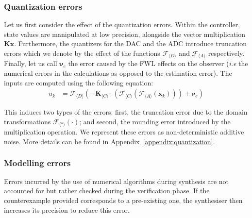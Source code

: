 \documentclass[sigconf]{llncs}
\newcommand{\mat}[1]{\boldsymbol{#1}}
\renewcommand{\vec}[1]{\boldsymbol{#1}}
\begin{document}



\subsubsection{Quantization errors} \label{sec:quantization}

Let us first consider the effect of the quantization errors. 
Within the controller, state values are manipulated at low precision,
alongside the vector multiplication $\mat{K}\vec{x}$.
Furthermore, 
the quantizers for the DAC and the ADC introduce truncation errors
which we denote by the effect of the functions $\mathcal{F}_{\langle D \rangle}$
and $\mathcal{F}_{\langle A \rangle}$ respectively. Finally, let us call $\vec{\nu}_e$ the
error caused by the FWL effects on the observer (\emph{i.e} the numerical errors 
in the calculations as opposed to the estimation error).
The inputs are computed using the following equation: 
%
\begin{align}
u_{k}&=\mathcal{F}_{\langle D \rangle}\left(-\mat{K}_{\langle C \rangle}\cdot\left(\mathcal{F}_{\langle C \rangle}\left(\mathcal{F}_{\langle A \rangle}(\vec{x}_{k})\right)\right) +\vec{\nu}_e\right)
\label{eq:uk}
\end{align}

This induces two types of the errors: first, the truncation
error due to the domain transformations $\mathcal{F}_{\langle *
\rangle}(\cdot)$; and second, the rounding error introduced by the
multiplication operation.  We represent these errors as non-deterministic
additive noise. More details can be found in Appendix~\ref{appendix:quantization}.

\subsubsection{Modelling errors}

Errors incurred by the use of numerical algorithms during synthesis are not
accounted for but rather checked during the verification phase.  If the
counterexample provided corresponds to a pre-existing one, the synthesiser
then increases its precision to reduce this error.
\end{document}
